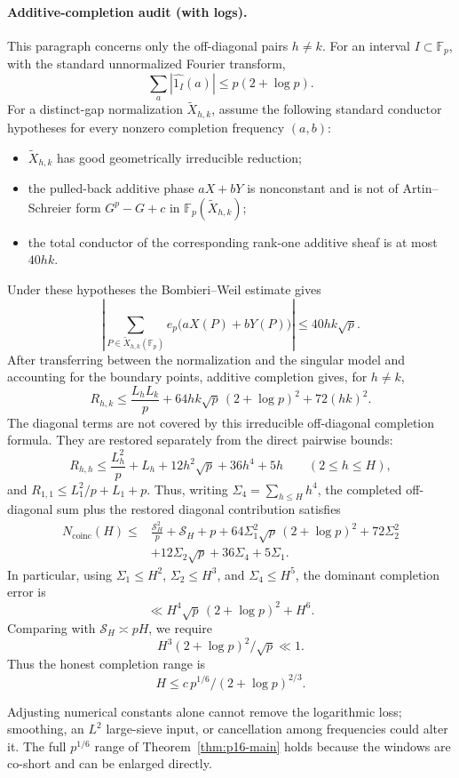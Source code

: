 \paragraph{Additive-completion audit (with logs).}
This paragraph concerns only the off-diagonal pairs $h\ne k$.  For an
interval $I\subset\mathbb F_p$, with the standard unnormalized Fourier
transform,
\[
 \sum_a|\widehat{1_I}(a)|\le p(2+\log p).
\]
For a distinct-gap normalization $\widetilde X_{h,k}$, assume the
following standard conductor hypotheses for every nonzero completion
frequency $(a,b)$:
\begin{itemize}
\item $\widetilde X_{h,k}$ has good geometrically irreducible
reduction;
\item the pulled-back additive phase $aX+bY$ is nonconstant and is not
of Artin--Schreier form $G^p-G+c$ in
$\mathbb F_p(\widetilde X_{h,k})$;
\item the total conductor of the corresponding rank-one additive sheaf
is at most $40hk$.
\end{itemize}
Under these hypotheses the Bombieri--Weil estimate gives
\[
 \left|\sum_{P\in\widetilde X_{h,k}(\mathbb F_p)}
 e_p\bigl(aX(P)+bY(P)\bigr)\right|
 \le40hk\sqrt p .
\]
After transferring between the normalization and the singular model
and accounting for the boundary points, additive completion gives, for
$h\ne k$,
\[
 R_{h,k}
 \le\frac{L_hL_k}{p}
 +64hk\sqrt p\,(2+\log p)^2
 +72(hk)^2 .
\]
The diagonal terms are not covered by this irreducible off-diagonal
completion formula.  They are restored separately from the direct
pairwise bounds:
\[
 R_{h,h}
 \le\frac{L_h^2}{p}
 +L_h
 +12h^2\sqrt p
 +36h^4
 +5h
 \qquad(2\le h\le H),
\]
and $R_{1,1}\le L_1^2/p+L_1+p$.  Thus, writing
$\Sigma_4=\sum_{h\le H}h^4$, the completed off-diagonal sum plus the
restored diagonal contribution satisfies
\[
\begin{aligned}
 N_{\mathrm{coinc}}(H)
 \le{}&\frac{\mathcal S_H^2}{p}+\mathcal S_H+p
 +64\Sigma_1^2\sqrt p\,(2+\log p)^2
 +72\Sigma_2^2\\
 &+12\Sigma_2\sqrt p+36\Sigma_4+5\Sigma_1 .
\end{aligned}
\]
In particular, using $\Sigma_1\le H^2$, $\Sigma_2\le H^3$, and
$\Sigma_4\le H^5$, the dominant completion error is
\[
 \ll H^4\sqrt p\,(2+\log p)^2+H^6 .
\]
Comparing with $\mathcal S_H\asymp pH$, we require
\[
 H^3(2+\log p)^2/\sqrt p\ll1 .
\]
Thus the honest completion range is
\[
 \boxed{\
 H\le c\,p^{1/6}/(2+\log p)^{2/3}.\ }
\]

\begin{remark}\label{rem:p16-log}
Adjusting numerical constants alone cannot remove the logarithmic
loss; smoothing, an $L^2$ large-sieve input, or cancellation among
frequencies could alter it.  The full $p^{1/6}$ range of
Theorem~\ref{thm:p16-main} holds because the windows are co-short and
can be enlarged directly.
\end{remark}

